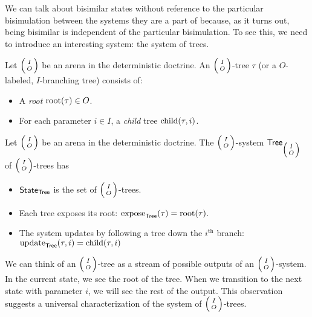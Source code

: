 \documentclass[DynamicalBook]{subfiles}
\begin{document}
We can talk about bisimilar states without reference to the particular
bisimulation between the systems they are a part of because, as it turns out,
being bisimilar is independent of the particular bisimulation. To see this, we
need to introduce an interesting system: the system of trees.

\begin{definition}
  Let $\lens{I}{O}$ be an arena in the deterministic doctrine. An
  $\lens{I}{O}$-tree $\tau$ (or a $O$-labeled, $I$-branching tree) consists of:
  \begin{itemize}
    \item A \emph{root} $\mathrm{root}(\tau) \in O$.
    \item For each parameter $i \in I$, a \emph{child} tree $\mathrm{child}(\tau,
      i)$.
  \end{itemize}
\end{definition}


\begin{definition}
Let $\lens{I}{O}$ be an arena in the deterministic doctrine. The $\lens{I}{O}$-system
$\Sys{Tree}_{\littlelens{I}{O}}$ of $\lens{I}{O}$-trees has
\begin{itemize}
\item $\mathsf{State}_{\mathsf{Tree}}$ is the set of $\lens{I}{O}$-trees.
\item Each tree exposes its root: $\mathrm{expose}_{\mathsf{Tree}}(\tau) = \mathrm{root}(\tau)$.
\item The system updates by following a tree down the $i^{\text{th}}$ branch: $\mathrm{update}_{\mathsf{Tree}}(\tau, i) = \mathrm{child}(\tau, i)$
\end{itemize}
\end{definition}

We can think of an $\lens{I}{O}$-tree as a stream of possible outputs of an
$\lens{I}{O}$-system. In the current state, we see the root of the tree. When we
transition to the next state with parameter $i$, we will see the rest of the
output. This observation suggests a universal characterization of the system of $\lens{I}{O}$-trees.
\end{document}
